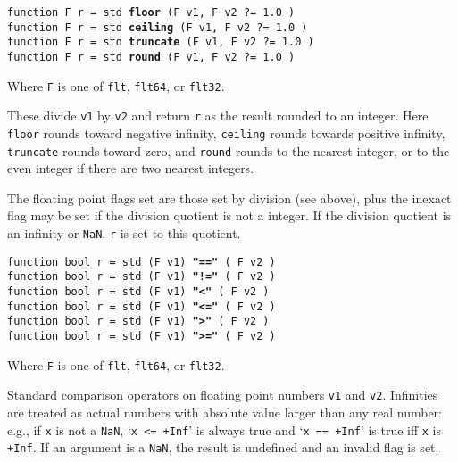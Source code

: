 \documentclass[12pt]{article}
\newcommand{\ttkey}[1]{{\tt \bfseries #1}}
\newenvironment{indpar}[1][0.3in]%
	{\begin{list}{}%
		     {\setlength{\itemsep}{0in}%
		      \setlength{\topsep}{0in}%
		      \setlength{\parsep}{1ex}%
		      \setlength{\labelwidth}{#1}%
		      \setlength{\leftmargin}{#1}%
		      \addtolength{\leftmargin}{\labelsep}}%
	 \item}%
	{\end{list}}
\begin{document}
{\tt function F r = std \ttkey{floor} (F v1, F v2 ?=~1.0 )} \\
{\tt function F r = std \ttkey{ceiling} (F v1, F v2 ?=~1.0 )} \\
{\tt function F r = std \ttkey{truncate} (F v1, F v2 ?=~1.0 )} \\
{\tt function F r = std \ttkey{round} (F v1, F v2 ?=~1.0 )}
\begin{indpar}
Where {\tt F} is one of {\tt flt}, {\tt flt64}, or {\tt flt32}.

These divide {\tt v1} by {\tt v2} and return {\tt r} as the
result rounded to an integer.
Here {\tt floor} rounds toward negative infinity, {\tt ceiling}
rounds towards positive infinity, {\tt truncate} rounds toward
zero, and {\tt round} rounds to the nearest integer, or to the
even integer if there are two nearest integers.

The floating point flags set are those set by division (see above), plus the
inexact flag may be set if the division quotient is not a integer.
If the division quotient is an infinity or {\tt NaN},
{\tt r} is set to this quotient.
\end{indpar}

{\tt function bool r = std (F v1) \ttkey{"=="} ( F v2 )} \\
{\tt function bool r = std (F v1) \ttkey{"!="} ( F v2 )} \\
{\tt function bool r = std (F v1) \ttkey{"<"} ( F v2 )} \\
{\tt function bool r = std (F v1) \ttkey{"<="} ( F v2 )} \\
{\tt function bool r = std (F v1) \ttkey{">"} ( F v2 )} \\
{\tt function bool r = std (F v1) \ttkey{">="} ( F v2 )}
\begin{indpar}
Where {\tt F} is one of {\tt flt}, {\tt flt64}, or {\tt flt32}.

Standard comparison operators on floating point numbers {\tt v1} and {\tt v2}.
Infinities are treated as actual numbers with absolute value
larger than any real number: e.g., if {\tt x} is not a {\tt NaN},
`{\tt x <= +Inf}' is always
true and `{\tt x == +Inf}' is true iff {\tt x} is {\tt +Inf}.
If an argument is a {\tt NaN}, the result is undefined and an invalid
flag is set.
\end{indpar}
\end{document}
